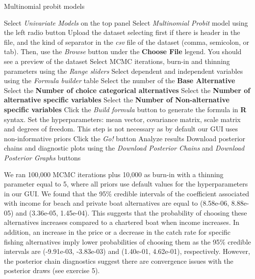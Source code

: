 \begin{algorithm}[h!]
	\caption{Multinomial probit models}\label{alg:MultinomialProbit}
	\begin{algorithmic}[1]  		 			
		\State Select \textit{Univariate Models} on the top panel
		\State Select \textit{Multinomial Probit} model using the left radio button
		\State Upload the dataset selecting first if there is header in the file, and the kind of separator in the \textit{csv} file of the dataset (comma, semicolon, or tab). Then, use the \textit{Browse} button under the \textbf{Choose File} legend. You should see a preview of the dataset
		\State Select MCMC iterations, burn-in and thinning parameters using the \textit{Range sliders}
		\State Select dependent and independent variables using the \textit{Formula builder} table
		\State Select the number of the \textbf{Base Alternative}
		\State Select the \textbf{Number of choice categorical alternatives}
		\State Select the \textbf{Number of alternative specific variables}
		\State Select the \textbf{Number of Non-alternative specific variables} 
		\State Click the \textit{Build formula} button to generate the formula in \textbf{R} syntax.
		\State Set the hyperparameters: mean vector, covariance matrix, scale matrix and degrees of freedom. This step is not necessary as by default our GUI uses non-informative priors
		\State Click the \textit{Go!} button
		\State Analyze results
		\State Download posterior chains and diagnostic plots using the \textit{Download Posterior Chains} and \textit{Download Posterior Graphs} buttons
	\end{algorithmic} 
\end{algorithm}


We ran 100,000 MCMC iterations plus 10,000 as burn-in with a thinning parameter equal to 5, where all priors use default values for the hyperparameters in our GUI. We found that the 95\% credible intervals of the coefficient associated with income for beach and private boat alternatives are equal to  (8.58e-06, 8.88e-05) and (3.36e-05, 1.45e-04). This suggests that the probability of choosing these alternatives increases compared to a chartered boat when income increases. In addition, an increase in the price or a decrease in the catch rate for specific fishing alternatives imply lower probabilities of choosing them as the 95\% credible intervals are (-9.91e-03, -3.83e-03) and (1.40e-01, 4.62e-01), respectively. However, the posterior chain diagnostics suggest there are convergence issues with the posterior draws (see exercise 5). 

